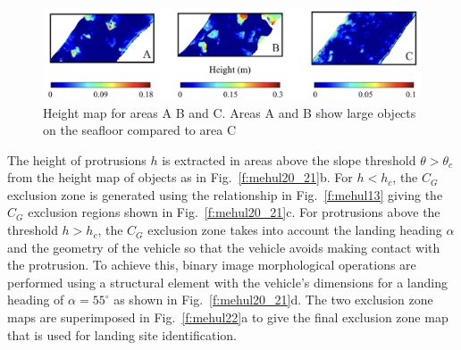 \begin{figure}[!ht]
\centering
\includegraphics[width=6in]{./images/mehul19.png}
\caption{Height map for areas A B and C. Areas A and B show large objects on the seafloor compared to area C}
\label{f:mehul19}
\end{figure}

The height of protrusions $h$ is extracted in areas above the slope threshold $\theta > \theta_c$ from the height map of objects as in Fig.~\ref{f:mehul20_21}b. For $h < h_c$, the $C_G$ exclusion zone is generated using the relationship in Fig.~\ref{f:mehul13} giving the $C_G$ exclusion regions shown in Fig.~\ref{f:mehul20_21}c. For protrusions above the threshold $h > h_c$, the $C_G$ exclusion zone takes into account the landing heading $\alpha$ and the geometry of the vehicle so that the vehicle avoids making contact with the protrusion. To achieve this, binary image morphological operations are performed using a structural element with the vehicle's dimensions for a landing heading of $\alpha=55^\circ$ as shown in Fig.~\ref{f:mehul20_21}d. The two exclusion zone maps are superimposed in Fig.~\ref{f:mehul22}a to give the final exclusion zone map that is used for landing site identification.





